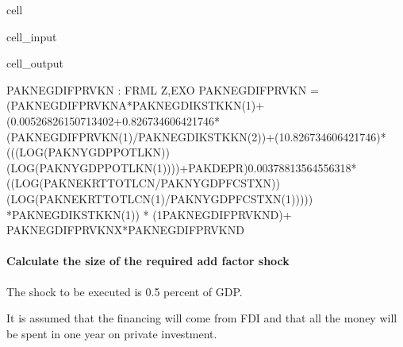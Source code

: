\documentclass[letterpaper,10pt,english]{jupyterBook}
\begin{document}
\begin{sphinxuseclass}{cell}\begin{sphinxVerbatimInput}

\begin{sphinxuseclass}{cell_input}
\begin{sphinxVerbatim}[commandchars=\\\{\}]
\PYG{p}{[}\PYG{p}{]}
\end{sphinxVerbatim}

\end{sphinxuseclass}\end{sphinxVerbatimInput}
\begin{sphinxVerbatimOutput}

\begin{sphinxuseclass}{cell_output}
\begin{sphinxVerbatim}[commandchars=\\\{\}]
PAKNEGDIFPRVKN : FRML \PYGZlt{}Z,EXO\PYGZgt{} PAKNEGDIFPRVKN = (\PYGZhy{}PAKNEGDIFPRVKN\PYGZus{}A*PAKNEGDIKSTKKN(\PYGZhy{}1)+ (\PYGZhy{}0.00526826150713402+0.826734606421746*(PAKNEGDIFPRVKN(\PYGZhy{}1)/PAKNEGDIKSTKKN(\PYGZhy{}2))+(1\PYGZhy{}0.826734606421746)*(((LOG(PAKNYGDPPOTLKN))\PYGZhy{}(LOG(PAKNYGDPPOTLKN(\PYGZhy{}1))))+PAKDEPR)\PYGZhy{}0.00378813564556318*((LOG(PAKNEKRTTOTLCN/PAKNYGDPFCSTXN))\PYGZhy{}(LOG(PAKNEKRTTOTLCN(\PYGZhy{}1)/PAKNYGDPFCSTXN(\PYGZhy{}1))))) *PAKNEGDIKSTKKN(\PYGZhy{}1)) * (1\PYGZhy{}PAKNEGDIFPRVKN\PYGZus{}D)+ PAKNEGDIFPRVKN\PYGZus{}X*PAKNEGDIFPRVKN\PYGZus{}D \PYGZdl{}
\end{sphinxVerbatim}

\end{sphinxuseclass}\end{sphinxVerbatimOutput}

\end{sphinxuseclass}

\paragraph{Calculate the size of the required add factor shock}
\label{\detokenize{content/06_WBModels/ScenarioAnalysis:calculate-the-size-of-the-required-add-factor-shock}}
\sphinxAtStartPar
The shock to be executed is 0.5 percent of GDP.

\sphinxAtStartPar
It is assumed that the financing will come from FDI and that all the money will be spent in one year on private investment.
\end{document}
